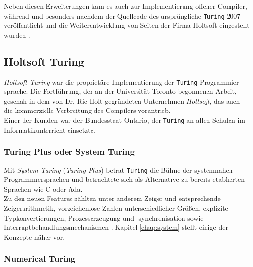 Neben diesen Erweiterungen kam es auch zur Implementierung offener Compiler, w\"ahrend und besonders nachdem der Quellcode des urspr\"ungliche \texttt{Turing} 2007 ver\"offentlicht und die Weiterentwicklung von Seiten der Firma Holtsoft eingestellt wurden \cite{www:tur}.

\subsection{Holtsoft Turing}

{\em Holtsoft Turing} war die propriet\"are Implementierung der \texttt{Turing}-Programmier-sprache. Die Fortf\"uhrung, der an der Universit\"at Toronto begonnenen Arbeit, geschah in dem von Dr. Ric Holt gegr\"undeten Unternehmen {\em Holtsoft}, das auch die kommerzielle Verbreitung des Compilers vorantrieb. \\
Einer der Kunden war der Bundesstaat Ontario, der \texttt{Turing} an allen Schulen im Informatikunterricht einsetzte.

\subsubsection{Turing Plus oder System Turing}

Mit {\em System Turing} ({\em Turing Plus}) betrat \texttt{Turing} die B\"uhne der systemnahen Programmiersprachen und betrachtete sich als Alternative zu bereits etablierten Sprachen wie C oder Ada. \\
Zu den neuen Features z\"ahlten unter anderem Zeiger und entsprechende Zeigerarithmetik, vorzeichenlose Zahlen unterschiedlicher Gr\"o\ss{}en, explizite Typkonvertierungen, Prozesserzeugung und -synchronisation sowie Interruptbehandlungsmechanismen \cite{Holt:88}. Kapitel \ref{chap:system} stellt einige der Konzepte n\"aher vor.

\subsubsection{Numerical Turing}

